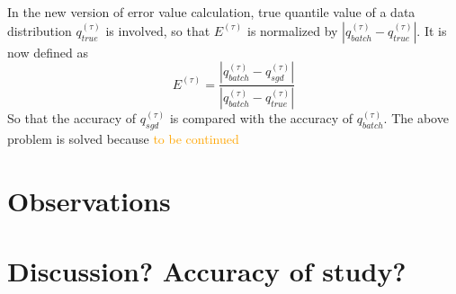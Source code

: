 \documentclass[12pt]{article}
\begin{document}
\\\\
In the new version of error value calculation, true quantile value of a data distribution $q_{true}^{(\tau)}$ is involved, so that $E^{(\tau)}$ is normalized by $|q_{batch}^{(\tau)} - q_{true}^{(\tau)}|$. It is now defined as
$$
    E^{(\tau)} = \frac{|q_{batch}^{(\tau)} - q_{sgd}^{(\tau)}|}
                      {|q_{batch}^{(\tau)} - q_{true}^{(\tau)}|}
$$
So that the accuracy of $q_{sgd}^{(\tau)}$ is compared with the accuracy of $q_{batch}^{(\tau)}$. The above problem is solved because \textcolor{orange}{to be continued}

\section{Observations}


\section{Discussion? Accuracy of study?}
\end{document}
